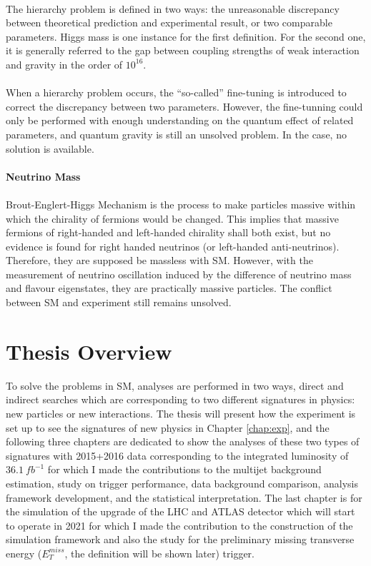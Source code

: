\\The hierarchy problem is defined in two ways: the unreasonable discrepancy between theoretical prediction and experimental result, or two comparable parameters. Higgs mass is one instance for the first definition. For the second one, it is generally referred to the gap between coupling strengths of weak interaction and gravity in the order of $10^{16}$.
\\
\\When a hierarchy problem occurs, the ``so-called'' fine-tuning is introduced to correct the discrepancy between two parameters. However, the fine-tunning could only be performed with enough understanding on the quantum effect of related parameters, and quantum gravity is still an unsolved problem. In the case, no solution is available.
\\
\\{\bf Neutrino Mass}
\\
\\Brout-Englert-Higgs Mechanism is the process to make particles massive within which the chirality of fermions would be changed. This implies that massive fermions of right-handed and left-handed chirality shall both exist, but no evidence is found for right handed neutrinos (or left-handed anti-neutrinos). Therefore, they are supposed be massless with SM. However, with the measurement of neutrino oscillation\cite{SuperK} induced by the difference of neutrino mass and flavour eigenstates, they are practically massive particles. The conflict between SM and experiment still remains unsolved.
\section{Thesis Overview}
To solve the problems in SM, analyses are performed in two ways, direct and indirect searches which are corresponding to two different signatures in physics: new particles or new interactions. The thesis will present how the experiment is set up to see the signatures of new physics in Chapter \ref{chap:exp}, and the following three chapters are dedicated to show the analyses of these two types of signatures with 2015+2016 data corresponding to the integrated luminosity of $36.1~fb^{-1}$ for which I made the contributions to the multijet background estimation, study on trigger performance, data background comparison, analysis framework development, and the statistical interpretation. The last chapter is for the simulation of the upgrade of the LHC and ATLAS detector which will start to operate in 2021 for which I made the contribution to the construction of the simulation framework and also the study for the preliminary missing transverse energy ($E^{miss}_{T}$, the definition will be shown later) trigger.

